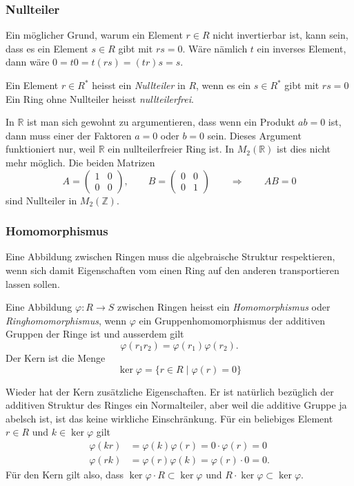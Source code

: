 \subsubsection{Nullteiler}
Ein möglicher Grund, warum ein Element $r\in R$ nicht invertierbar
ist, kann sein, dass es ein Element $s\in R$ gibt mit $rs=0$.
Wäre nämlich $t$ ein inverses Element, dann wäre $0=t0 = t(rs) = (tr)s=s$.

\begin{definition}
Ein Element $r\in R^*$ heisst ein {\em Nullteiler} in $R$,
wenn es ein $s\in R^*$ gibt mit $rs=0$
Ein Ring ohne Nullteiler heisst {\em nullteilerfrei}.
\end{definition}

In $\mathbb{R}$ ist man sich gewohnt zu argumentieren, dass wenn ein
Produkt $ab=0$ ist, dann muss einer der Faktoren $a=0$ oder $b=0$ sein.
Dieses Argument funktioniert nur, weil $\mathbb{R}$ ein nullteilerfreier
Ring ist.
In $M_2(\mathbb{R})$ ist dies nicht mehr möglich.
Die beiden Matrizen
\[
A=\begin{pmatrix}
1&0\\0&0
\end{pmatrix}
,\qquad
B=\begin{pmatrix}
0&0\\0&1
\end{pmatrix}
\qquad\Rightarrow\qquad
AB=0
\]
sind Nullteiler in $M_2(\mathbb{Z})$.

\subsubsection{Homomorphismus}
Eine Abbildung zwischen Ringen muss die algebraische Struktur respektieren,
wenn sich damit Eigenschaften vom einen Ring auf den anderen transportieren
lassen sollen.

\begin{definition}
Eine Abbildung $\varphi:R \to S$ zwischen Ringen heisst ein
{\em Homomorphismus}
%
oder {\em Ringhomomorphismus},
%
wenn $\varphi$ ein Gruppenhomomorphismus der additiven Gruppen der Ringe
ist und ausserdem gilt
\[
\varphi(r_1r_2) = \varphi(r_1)\varphi(r_2).
\]
Der Kern ist die Menge
\[
\ker\varphi = \{ r\in R\;|\; \varphi(r)=0\}
\]
%
\end{definition}

Wieder hat der Kern zusätzliche Eigenschaften.
Er ist natürlich bezüglich der additiven Struktur des Ringes ein
Normalteiler, aber weil die additive Gruppe ja abelsch ist, ist das
keine wirkliche Einschränkung.
Für ein beliebiges Element $r\in R$ und $k\in \ker\varphi$ gilt
\begin{align*}
\varphi(kr) &= \varphi(k)\varphi(r) = 0\cdot\varphi(r) = 0
\\
\varphi(rk) &= \varphi(r)\varphi(k) = \varphi(r)\cdot 0 = 0.
\end{align*}
Für den Kern gilt also, dass $\ker\varphi\cdot R\subset \ker\varphi$
und $R\cdot\ker\varphi\subset\ker\varphi$.

